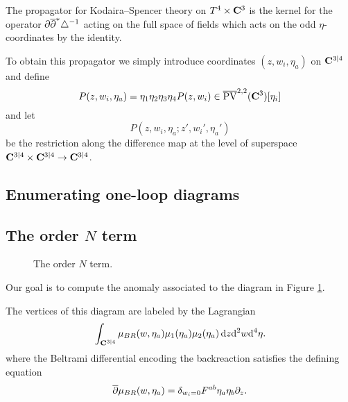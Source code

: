 \documentclass[../main.tex]{subfiles}
\begin{document}
The propagator for Kodaira--Spencer theory on $T^4 \times \mathbf{C}^3$ is the kernel for the operator $\partial \overline{\partial}^* \triangle^{-1}$ acting on the full space of fields which acts on the odd $\eta$-coordinates by the identity.

To obtain this propagator we simply introduce coordinates $(z , w_i, \eta_a)$ on $\mathbf{C}^{3|4}$ and define
\[
P(z , w_i, \eta_a) = \eta_1 \eta_2 \eta_3 \eta_4 P(z,w_i) \in \overline{{\rm PV}}^{2,2}(\mathbf{C}^3) [\eta_i] 
\]
and let
\[
P(z , w_i, \eta_a ; z', w_i', \eta_a')
\]
be the restriction along the difference map at the level of superspace $\mathbf{C}^{3|4} \times \mathbf{C}^{3|4} \to \mathbf{C}^{3|4}$.

\subsection{Enumerating one-loop diagrams}

\subsection{The order $N$ term} 
\label{sec:oneloop}

\begin{figure}
	\label{fig:orderN}
	\caption{The order $N$ term.}  
\end{figure}

Our goal is to compute the anomaly associated to the diagram in Figure \ref{fig:orderN}.

The vertices of this diagram are labeled by the Lagrangian
\[
\int_{\mathbf{C}^{3|4}} \mu_{BR} (w,\eta_a) \mu_1(\eta_a) \mu_2(\eta_a) \, \mathrm{d} z \mathrm{d}^2 w \mathrm{d}^4 \eta .
\]
where the Beltrami differential encoding the backreaction satisfies the defining equation
\[
\overline{\partial} \mu_{BR} (w,\eta_a) = \delta_{w_i=0} F^{ab} \eta_a \eta_b \partial_z  .
\]
\end{document}
